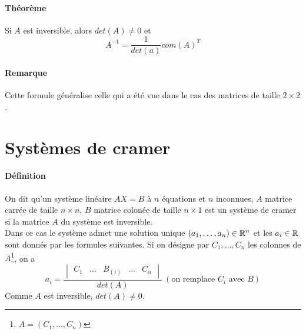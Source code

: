 \paragraph{Théorème} Si $A$ est inversible, alors $det(A) \neq 0$ et 
$$A^{-1} = \frac{1}{det(a)} com(A)^{T}$$

\paragraph{Remarque} Cette formule généralise celle qui a été vue dans le cas des matrices de taille $2 \times 2$.

%
%
\section{Systèmes de cramer}
%
%
\paragraph{Définition} On dit qu'un système linéaire $A X = B$ à $n$ équations et $n$ inconnues, $A$ matrice carrée de taille $n \times n$, $B$ matrice colonée de taille $n\times 1$ est un système de cramer si la matrice $A$ du système est inversible. \\
Dans ce cas le système admet une solution unique $(a_1, \ldots, a_n) \in \mathbb{R}^n$ et les $a_i \in \mathbb{R}$ sont donnés par les formules suivantes. Si on désigne par $C_1, \ldots, C_n$ les colonnes de $A$\footnote{$A = (C_1, \ldots, C_n)$}, on a
$$a_i = \frac{\begin{vmatrix} C_1 & \ldots & B_{(i)} & \ldots & C_n \end{vmatrix}}{det(A)} ~ (\text{on remplace } C_i \text{ avec } B)$$
Comme $A$ est inversible, $det(A) \neq 0$.

